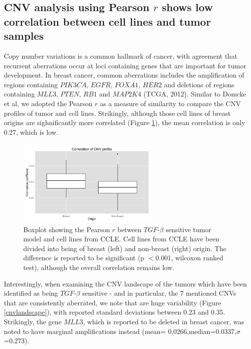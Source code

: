 \documentclass[a4paper,12pt]{article}
\begin{document}
\subsection{CNV analysis using Pearson $\textit{r}$ shows low
  correlation between cell lines and tumor samples}
Copy number variations is a common hallmark of cancer, with agreement
that recurrent aberrations occur at loci containing genes that are
important for tumor development. In breast cancer, common aberrations
includes the amplification of regions containing $\textit{PIK3CA}$, $\textit{EGFR}$,
$\textit{FOXA1}$, $\textit{HER2}$ and deletions of regions containing
$\textit{MLL3}$, $\textit{PTEN}$,  $\textit{RB1}$ and
$\textit{MAP2K4}$ (TCGA, 2012).
Similar to Domcke et al, we adopted the Pearson $\textit{r}$ as a
measure of similarity to compare the CNV profiles of tumor and cell
lines. Strikingly, although those cell lines of breast origins are
sighnificantly more correlated (Figure \ref{cnv}), the mean
correlation is only 0.27, which is low.
\begin{figure}[t!]
\centering
\includegraphics[width=7cm]{CNVcorrelations.png}
\caption[Boxplot showing Pearson $\textit{r}$ of cell lines from
breast and non-breast origin]{Boxplot showing the Pearson $\textit{r}$
between   $\textit{TGF}$-$\beta$ sensitive tumor model and cell lines from
  CCLE. Cell lines from CCLE have been divided into being of breast
  (left) and non-breast (right) origin. The difference is reported to
  be significant (p $<$0.001, wilcoxon ranked test), although the overall
correlation remains low.}
\label{cnv}
\end{figure}
Interestingly, when examining the CNV landscape of the tumors which
have been identified as being $\textit{TGF}$-$\beta$ sensitive - and
in particular, the 7 mentioned CNVs that are consistently aberrated,
we note that are huge variability (Figure \ref{cnvlandscape}), with
reported standard deviations between 0.23 and 0.35. Strikingly, the
gene $\textit{MLL3}$, which is reported to be deleted in breast
cancer, was noted to have marginal amplifications instead (mean=
0.0266,median=0.0337,$\sigma$=0.273).
\end{document}

